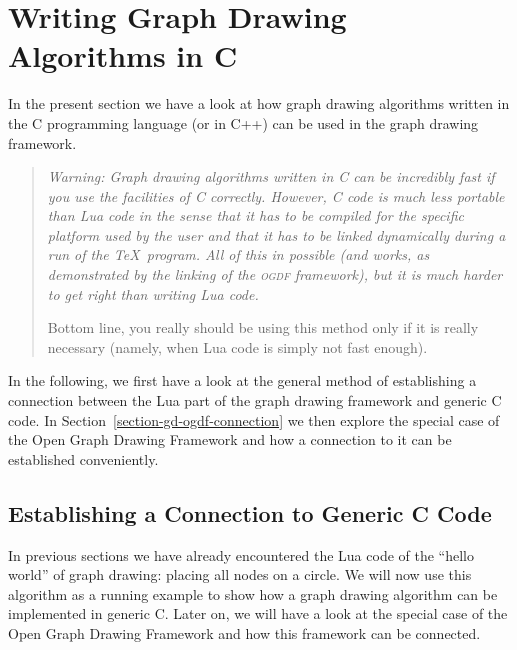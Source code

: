 %
%
%




\section{Writing Graph Drawing Algorithms in C}
\label{section-algorithms-in-c}


\bigskip

In the present section we have a look at how graph drawing
algorithms written in the C programming language (or in C++) can be
used in the graph drawing framework.

\begin{quote}
  \itshape Warning: Graph drawing algorithms written in C can be
  incredibly fast if you use the facilities of C
  correctly. \emph{However,} C code is much less portable than Lua 
  code in the sense that it has to be compiled for the specific
  platform used by the user and that it has to be linked dynamically
  during a run of the \TeX\ program. All of this in possible (and
  works, as demonstrated by the linking of the \textsc{ogdf}
  framework), but it is \emph{much} harder to get right than writing
  Lua code.

  Bottom line, you really should be using this method
  only if it is really necessary (namely, when Lua code is simply not
  fast enough).
\end{quote}

In the following, we first have a look at the general method of
establishing a connection between the Lua part of the graph drawing
framework and generic C code. In
Section~\ref{section-gd-ogdf-connection} we then explore the special
case of the Open Graph Drawing Framework and how a connection to it
can be established conveniently.


\subsection{Establishing a Connection to Generic C Code}

In previous sections we have already encountered the Lua code of the
``hello world'' of graph drawing: placing all nodes on a circle. We
will now use this algorithm as a running example to show how a graph
drawing algorithm can be implemented in generic C. Later on, we will
have a look at the special case of the Open Graph Drawing Framework
and how this framework can be connected. 


